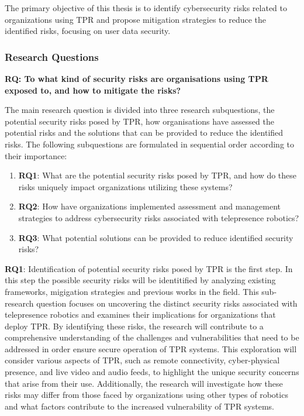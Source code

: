 The primary objective of this thesis is to identify cybersecurity risks related to organizations using \ac{TPR} and propose mitigation strategies to reduce the identified risks, focusing on user data security.

\subsubsection{Research Questions}

\textbf{RQ: To what kind of security risks are organisations using \ac{TPR} exposed to, and how to mitigate the risks?}


The main research question is divided into three research subquestions, the potential security risks posed by \ac{TPR}, how organisations
have assessed the potential risks and the solutions that can be provided to reduce the identified risks. The following subquestions are formulated
in sequential order according to their importance:

\begin{enumerate}
  \item\textbf{RQ1}: What are the potential security risks posed by \ac{TPR}, and how do these risks uniquely impact organizations utilizing these systems?
  \item\textbf{RQ2}: How have organizations implemented assessment and management strategies to address cybersecurity risks associated with telepresence robotics?
  \item\textbf{RQ3}: What potential solutions can be provided to reduce identified security risks?
\end{enumerate}

\textbf{RQ1}: Identification of potential security risks posed by \ac{TPR} is the first step. In this step the possible security risks will be identitified by analyzing existing frameworks, migigation strategies and previous works in the field. This sub-research question focuses on uncovering the distinct security risks associated with telepresence robotics and examines their implications for organizations that deploy \ac{TPR}.
  By identifying these risks, the research will contribute to a comprehensive understanding of the challenges and vulnerabilities that need to be addressed in order ensure secure operation of \ac{TPR} systems.
  This exploration will consider various aspects of \ac{TPR}, such as remote connectivity, cyber-physical presence, and live video and audio feeds, to highlight the unique security concerns that arise from their use.
  Additionally, the research will investigate how these risks may differ from those faced by organizations using other types of robotics and what factors contribute to the increased vulnerability of \ac{TPR} systems.

